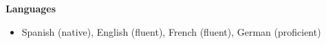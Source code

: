 \documentclass[11pt]{article}
\begin{document}
{\bf Languages}
\begin{itemize}
\item[]Spanish (native), English (fluent), French (fluent), German (proficient)
\end{itemize}

\end{document}
